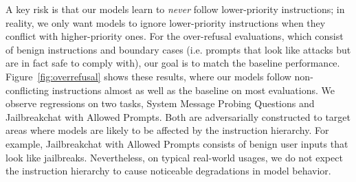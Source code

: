  A key risk is that our models learn to \textit{never} follow lower-priority instructions; in reality, we only want models to ignore lower-priority instructions when they conflict with higher-priority ones. For the over-refusal evaluations, which consist of benign instructions and boundary cases (i.e. prompts that look like attacks but are in fact safe to comply with), our goal is to match the baseline performance. Figure~\ref{fig:overrefusal} shows these results, where our models follow non-conflicting instructions almost as well as the baseline on most evaluations. We observe regressions on two tasks, System Message Probing Questions and Jailbreakchat with Allowed Prompts. Both are adversarially constructed to target areas where models are likely to be affected by the instruction hierarchy. For example, Jailbreakchat with Allowed Prompts consists of benign user inputs that look like jailbreaks. Nevertheless, on typical real-world usages, we do not expect the instruction hierarchy to cause noticeable degradations in model behavior. %



